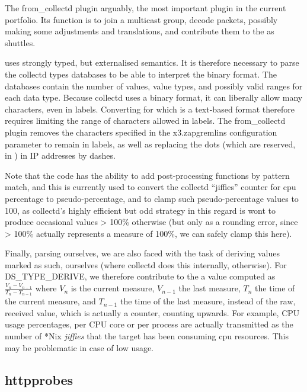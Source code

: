 The from\_collectd plugin arguably, the most important plugin in
the current portfolio. Its function is to join a multicast group,
decode \collectdproto{} packets, possibly making some adjustments and
translations, and contribute them to the \cauldron{} as \rawproto{}
shuttles.

\collectdproto{} uses strongly typed, but externalised semantics. It
is therefore necessary to parse the collectd types databases to be
able to interpret the binary format. The databases contain the number
of values, value types, and possibly valid ranges for each data type.
Because collectd uses a binary format, it can liberally allow many
characters, even in labels. Converting for \rawproto{} which is a
text-based format therefore requires limiting the range of characters
allowed in labels. The from\_collectd plugin removes the characters
specified in the x3.zapgremlins configuration parameter to remain in
labels, as well as replacing the dots (which are reserved, in \rawproto{})
in IP addresses by dashes.

Note that the code has the ability to add post-processing functions
by pattern match, and this is currently used to convert the collectd
``jiffies'' counter for cpu percentage to pseudo-percentage, and to clamp
such pseudo-percentage values to 100, as collectd's highly efficient
but odd strategy in this regard is wont to produce occasional values >
100\% otherwise (but only as a rounding error, since > 100\% actually
represents a measure of 100\%, we can safely clamp this here).

Finally, parsing \collectdproto{} ourselves, we are also faced
with the task of deriving values marked as such, ourselves (where
collectd does this internally, otherwise). For DS\_TYPE\_DERIVE,
we therefore contribute to the \cauldron{} a value computed as
$\frac{V_{n}-V_{n-1}}{T_{n}-T_{n-1}}$ where $V_n$ is the current measure,
$V_{n-1}$ the last measure, $T_n$ the time of the current measure, and
$T_{n-1}$ the time of the last measure, instead of the raw, received
value, which is actually a counter, counting upwards.  For example, CPU
usage percentages, per CPU core or per process are actually transmitted
as the number of *Nix \emph{jiffies} that the target has been consuming
cpu resources. This may be problematic in case of low usage.

\subsection{httpprobes}


